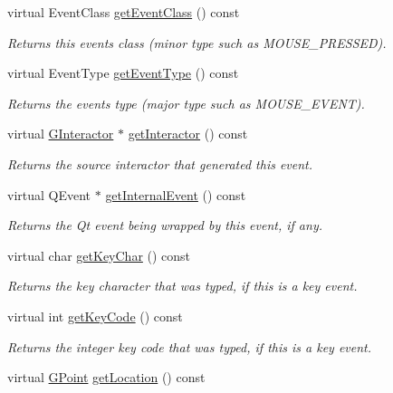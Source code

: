 \begin{DoxyCompactItemize}
virtual Event\+Class \mbox{\hyperlink{classGEvent_a84e9319971c682404ea8f030cfee38f9}{get\+Event\+Class}} () const
\begin{DoxyCompactList}\small\item\em Returns this event\textquotesingle{}s class (minor type such as M\+O\+U\+S\+E\+\_\+\+P\+R\+E\+S\+S\+ED). \end{DoxyCompactList}\item 
virtual Event\+Type \mbox{\hyperlink{classGEvent_a404fe4b126a8443600109a62ef7ce6a2}{get\+Event\+Type}} () const
\begin{DoxyCompactList}\small\item\em Returns the event\textquotesingle{}s type (major type such as M\+O\+U\+S\+E\+\_\+\+E\+V\+E\+NT). \end{DoxyCompactList}\item 
virtual \mbox{\hyperlink{classGInteractor}{G\+Interactor}} $\ast$ \mbox{\hyperlink{classGEvent_ac8998a7ac699a98fbdc125ef0f3d64f1}{get\+Interactor}} () const
\begin{DoxyCompactList}\small\item\em Returns the source interactor that generated this event. \end{DoxyCompactList}\item 
virtual Q\+Event $\ast$ \mbox{\hyperlink{classGEvent_ab3589ee7d7005f6a323ff2c968f82038}{get\+Internal\+Event}} () const
\begin{DoxyCompactList}\small\item\em Returns the Qt event being wrapped by this event, if any. \end{DoxyCompactList}\item 
virtual char \mbox{\hyperlink{classGEvent_ab23396e09d92df320d2324b47a0766e8}{get\+Key\+Char}} () const
\begin{DoxyCompactList}\small\item\em Returns the key character that was typed, if this is a key event. \end{DoxyCompactList}\item 
virtual int \mbox{\hyperlink{classGEvent_a71429f4b3c8f3c5097fe39e50501bbb6}{get\+Key\+Code}} () const
\begin{DoxyCompactList}\small\item\em Returns the integer key code that was typed, if this is a key event. \end{DoxyCompactList}\item 
virtual \mbox{\hyperlink{classGPoint}{G\+Point}} \mbox{\hyperlink{classGEvent_a4f83802015511edeb63b892830812c11}{get\+Location}} () const

\end{DoxyCompactItemize}
